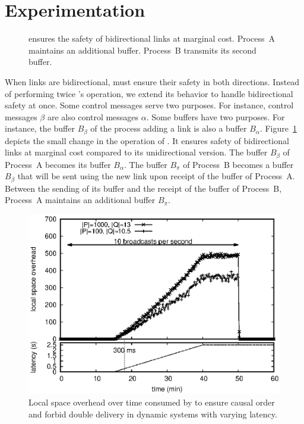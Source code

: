
\section{Experimentation}
\label{sec:experimentation}

\begin{figure}
  \begin{center}
  
  \caption{\label{fig:bibroadcast}\RPCBROADCAST ensures the safety of bidirectional links
    at marginal cost. Process~A maintains an additional buffer. Process~B transmits its
    second buffer.}
  \end{center}
\end{figure}

When links are bidirectional, \RPCBROADCAST must ensure their safety
in both directions. Instead of performing twice \RPCBROADCAST's
operation, we extend its behavior to handle bidirectional safety at
once. Some control messages serve two purposes. For instance, control
messages $\beta$ are also control messages $\alpha$. Some buffers have
two purposes. For instance, the buffer $B_\beta$ of the process adding
a link is also a buffer $B_\alpha$.  Figure~\ref{fig:bibroadcast}
depicts the small change in the operation of \RPCBROADCAST. It ensures
safety of bidirectional links at marginal cost compared to its
unidirectional version. The buffer $B_\beta$ of Process~A becomes its
buffer $B_\alpha$. The buffer $B_\pi$ of Process~B becomes a buffer
$B_\beta$ that will be sent using the new link upon receipt of the
buffer of Process~A. Between the sending of its buffer and the receipt
of the buffer of Process~B, Process~A maintains an additional buffer
$B_\pi$. 


\begin{figure}
  \begin{center}
    \includegraphics[width=0.8\columnwidth]{./img/overhead.eps}
    \caption{\label{fig:overhead}Local space overhead over time consumed by \RPCBROADCAST to ensure
      causal order and forbid double delivery in dynamic systems with varying latency.}
  \end{center}
\end{figure}


